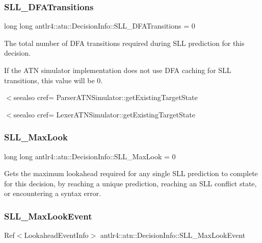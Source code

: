 \subsubsection{\texorpdfstring{S\+L\+L\+\_\+\+D\+F\+A\+Transitions}{SLL\_DFATransitions}}
{\footnotesize\ttfamily long long antlr4\+::atn\+::\+Decision\+Info\+::\+S\+L\+L\+\_\+\+D\+F\+A\+Transitions = 0}



The total number of D\+FA transitions required during S\+LL prediction for this decision. 

If the A\+TN simulator implementation does not use D\+FA caching for S\+LL transitions, this value will be 0.

$<$seealso cref= Parser\+A\+T\+N\+Simulator\+::get\+Existing\+Target\+State 

$<$seealso cref= Lexer\+A\+T\+N\+Simulator\+::get\+Existing\+Target\+State \mbox{\label{classantlr4_1_1atn_1_1DecisionInfo_a79f953eada792e1239b292a4a2163138}} 
\subsubsection{\texorpdfstring{S\+L\+L\+\_\+\+Max\+Look}{SLL\_MaxLook}}
{\footnotesize\ttfamily long long antlr4\+::atn\+::\+Decision\+Info\+::\+S\+L\+L\+\_\+\+Max\+Look = 0}



Gets the maximum lookahead required for any single S\+LL prediction to complete for this decision, by reaching a unique prediction, reaching an S\+LL conflict state, or encountering a syntax error. 

\mbox{\label{classantlr4_1_1atn_1_1DecisionInfo_a85c7fd7170cfc98eef6434ff7221ac9d}} 
\subsubsection{\texorpdfstring{S\+L\+L\+\_\+\+Max\+Look\+Event}{SLL\_MaxLookEvent}}
{\footnotesize\ttfamily Ref$<$Lookahead\+Event\+Info$>$ antlr4\+::atn\+::\+Decision\+Info\+::\+S\+L\+L\+\_\+\+Max\+Look\+Event}

